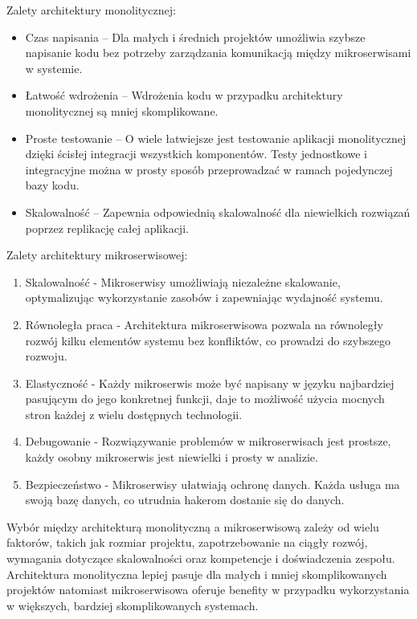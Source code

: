 \documentclass[runningheads,12pt]{llncs}
\begin{document}
Zalety architektury monolitycznej:

\begin{itemize}
    \item Czas napisania – Dla małych i średnich projektów umożliwia szybsze napisanie kodu bez potrzeby zarządzania komunikacją między mikroserwisami w systemie.
    \item Łatwość wdrożenia – Wdrożenia kodu w przypadku architektury monolitycznej są mniej skomplikowane.
    \item Proste testowanie – O wiele łatwiejsze jest testowanie aplikacji monolitycznej dzięki ścisłej integracji wszystkich komponentów. Testy jednostkowe i integracyjne można w prosty sposób przeprowadzać w ramach pojedynczej bazy kodu.
    \item Skalowalność – Zapewnia odpowiednią skalowalność dla niewielkich rozwiązań poprzez replikację całej aplikacji.
\end{itemize}

Zalety architektury mikroserwisowej:

\begin{enumerate}
    \item Skalowalność - Mikroserwisy umożliwiają niezależne skalowanie, optymalizując wykorzystanie zasobów i zapewniając wydajność systemu.
    \item Równoległa praca - Architektura mikroserwisowa pozwala na równoległy rozwój kilku elementów systemu bez konfliktów, co prowadzi do szybszego rozwoju.
    \item Elastyczność - Każdy mikroserwis może być napisany w języku najbardziej pasującym do jego konkretnej funkcji, daje to możliwość użycia mocnych stron każdej z wielu dostępnych technologii.
    \item Debugowanie - Rozwiązywanie problemów w mikroserwisach jest prostsze, każdy osobny mikroserwis jest niewielki i prosty w analizie.
    \item Bezpieczeństwo - Mikroserwisy ułatwiają ochronę danych. Każda usługa ma swoją bazę danych, co utrudnia hakerom dostanie się do danych.~\cite{sharma2023monolithic}
\end{enumerate}

Wybór między architekturą monolityczną a mikroserwisową zależy od wielu faktorów, takich jak rozmiar projektu, zapotrzebowanie na ciągły rozwój, wymagania dotyczące skalowalności oraz kompetencje i doświadczenia zespołu. Architektura monolityczna lepiej pasuje dla małych i mniej skomplikowanych projektów natomiast mikroserwisowa oferuje benefity w przypadku wykorzystania w większych, bardziej skomplikowanych systemach.
\end{document}
